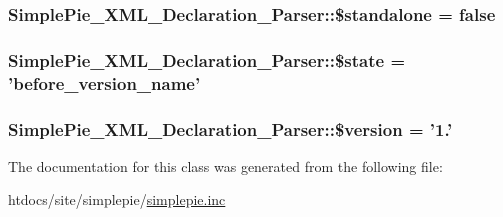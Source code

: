 \hypertarget{class_simple_pie___x_m_l___declaration___parser_abdbb5ec56807a5845327efee783d0415}{
\subsubsection[{\$standalone}]{\setlength{\rightskip}{0pt plus 5cm}Simple\-Pie\-\_\-\-X\-M\-L\-\_\-\-Declaration\-\_\-\-Parser\-::\$standalone = false}}\label{class_simple_pie___x_m_l___declaration___parser_abdbb5ec56807a5845327efee783d0415}
\hypertarget{class_simple_pie___x_m_l___declaration___parser_ade4aa70d388b976aa3598ebd0fcd7c40}{
\subsubsection[{\$state}]{\setlength{\rightskip}{0pt plus 5cm}Simple\-Pie\-\_\-\-X\-M\-L\-\_\-\-Declaration\-\_\-\-Parser\-::\$state = '{\bf before\-\_\-version\-\_\-name}'}}\label{class_simple_pie___x_m_l___declaration___parser_ade4aa70d388b976aa3598ebd0fcd7c40}
\hypertarget{class_simple_pie___x_m_l___declaration___parser_aacea4010f8eb65de247d715381ccfdcf}{
\subsubsection[{\$version}]{\setlength{\rightskip}{0pt plus 5cm}Simple\-Pie\-\_\-\-X\-M\-L\-\_\-\-Declaration\-\_\-\-Parser\-::\$version = '1.'}}\label{class_simple_pie___x_m_l___declaration___parser_aacea4010f8eb65de247d715381ccfdcf}


The documentation for this class was generated from the following file\-:\begin{DoxyCompactItemize}
\item 
htdocs/site/simplepie/\hyperlink{simplepie_8inc}{simplepie.\-inc}\end{DoxyCompactItemize}
